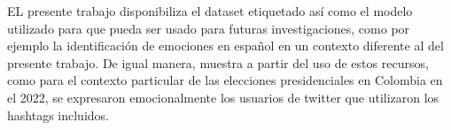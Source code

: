 EL presente trabajo disponibiliza el dataset etiquetado así como el modelo utilizado para que pueda ser usado para futuras investigaciones, como por ejemplo la identificación de emociones en español en un contexto diferente al del presente trabajo. De igual manera, muestra a partir del uso de estos recursos, como para el contexto particular de las elecciones presidenciales en Colombia en el 2022, se expresaron emocionalmente los usuarios de twitter que utilizaron los hashtags incluidos.
